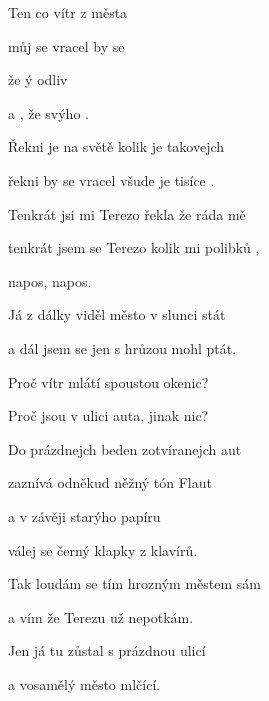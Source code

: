 

\zs
{Ten}  co vítr  z města 

můj  se vracel  by se 

že ý  odliv 

a , že svýho  .
\ks

\zr
{Řekni}  je na světě kolik je takovejch 

řekni  by se vracel všude je tisíce .

Tenkrát  jsi mi Terezo řekla že ráda mě 

tenkrát  jsem se Terezo kolik mi polibků ,

napos, napos.
\kr

\zs
Já z dálky viděl město v slunci stát

a dál jsem se jen s hrůzou mohl ptát.

Proč vítr mlátí spoustou okenic?

Proč jsou v ulici auta, jinak nic?
\ks

\zr  \kr

\zs
Do prázdnejch beden zotvíranejch aut

zaznívá odněkud něžný tón Flaut

a v závěji starýho papíru

válej se černý klapky z klavírů.
\ks

\zr  \kr

\zs
Tak loudám se tím hrozným městem sám

a vím že Terezu už nepotkám.

Jen já tu zůstal s prázdnou ulicí

a vosamělý město mlčící.
\ks

\zr  \kr

\kp























